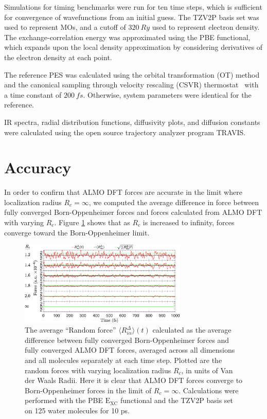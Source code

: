 \documentclass[10pt,aps,prl,twocolumn,amsmath,amssymb,superscriptaddress,longbibliography]{revtex4-1}
\begin{document}
Simulations for timing benchmarks were run for ten time steps, which is sufficient for convergence of wavefunctions from an initial guess.
The TZV2P basis set was used to represent MOs, and a cutoff of $\SI{320}{Ry}$ used to represent electron density. 
The exchange-correlation energy was approximated using the PBE functional, which expands upon the local density approximation by considering derivatives of the electron density at each point.~\cite{a:PBEfunctional} 

The reference PES was calculated using the orbital transformation (OT) method~\cite{a:ot,a:ot2} and the canonical sampling through velocity rescaling (CSVR) thermostat~\cite{a:CSVR} with a time constant of $\SI{200}{fs}$. 
Otherwise, system parameters were identical for the reference.

IR spectra, radial distribution functions, diffusivity plots, and diffusion constants were calculated using the open source trajectory analyzer program TRAVIS.~\cite{a:travis-main,a:travis-ir1,a:travis-ir2}

\section{Accuracy}

In order to confirm that ALMO DFT forces are accurate in the limit where localization radius $R_{c} = \infty$, we computed the average difference in force between fully converged Born-Oppenheimer forces and forces calculated from ALMO DFT with varying $R_{c}$. Figure \ref{fig:forcecomp} shows that as $R_{c}$ is increased to infinity, forces converge toward the Born-Oppenheimer limit.

\begin{figure}
\includegraphics[trim={0.1cm 0cm 0cm 0cm},clip,width=8cm]{DeltaForceComparison_ALMO_SCF.eps}
\caption{\label{fig:forcecomp}The average ``Random force'' $\langle R^{\Delta}_{i\alpha} \rangle (t)$ calculated as the average difference between fully converged Born-Oppenheimer forces and fully converged ALMO DFT forces, averaged across all dimensions and all molecules separately at each time step. 
Plotted are the random forces with varying localization radius $R_{c}$, in units of Van der Waals Radii.
Here it is clear that ALMO DFT forces converge to Born-Oppenheimer forces in the limit of $R_{c} = \infty$.
Calculations were performed with the PBE $\mathrm{E_{XC}}$ functional and the TZV2P basis set on 125 water molecules for 10 ps.}
\end{figure}
\end{document}
